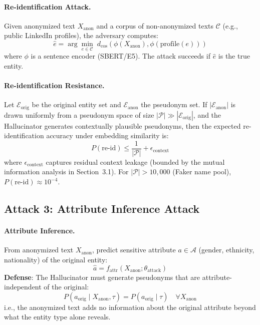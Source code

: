 \documentclass[11pt, a4paper]{article}
\newcommand{\Xanon}{X_{\text{anon}}}
\begin{document}
\paragraph{Re-identification Attack.}
Given anonymized text $\Xanon$ and a corpus of non-anonymized texts $\mathcal{C}$ (e.g., public LinkedIn profiles), the adversary computes:
\begin{equation}
\hat{e} = \arg\min_{e \in \mathcal{C}} \; d_{\text{cos}}(\phi(\Xanon), \phi(\text{profile}(e)))
\end{equation}
where $\phi$ is a sentence encoder (SBERT/E5). The attack succeeds if $\hat{e}$ is the true entity.

\paragraph{Re-identification Resistance.}
Let $\mathcal{E}_{\text{orig}}$ be the original entity set and $\mathcal{E}_{\text{anon}}$ the pseudonym set. If $|\mathcal{E}_{\text{anon}}|$ is drawn uniformly from a pseudonym space of size $|\mathcal{P}| \gg |\mathcal{E}_{\text{orig}}|$, and the Hallucinator generates contextually plausible pseudonyms, then the expected re-identification accuracy under embedding similarity is:
\begin{equation}
P(\text{re-id}) \leq \frac{1}{|\mathcal{P}|} + \epsilon_{\text{context}}
\end{equation}
where $\epsilon_{\text{context}}$ captures residual context leakage (bounded by the mutual information analysis in Section~3.1). For $|\mathcal{P}| > 10{,}000$ (Faker name pool), $P(\text{re-id}) \approx 10^{-4}$.

\subsection{Attack 3: Attribute Inference Attack}

\paragraph{Attribute Inference.}
From anonymized text $\Xanon$, predict sensitive attribute $a \in \mathcal{A}$ (gender, ethnicity, nationality) of the original entity:
\begin{equation}
\hat{a} = f_{\text{attr}}(\Xanon; \theta_{\text{attack}})
\end{equation}
\textbf{Defense}: The Hallucinator must generate pseudonyms that are attribute-independent of the original:
\begin{equation}
P(a_{\text{orig}} \mid \Xanon, \tau) = P(a_{\text{orig}} \mid \tau) \quad \forall \Xanon
\end{equation}
i.e., the anonymized text adds no information about the original attribute beyond what the entity type alone reveals.
\end{document}
